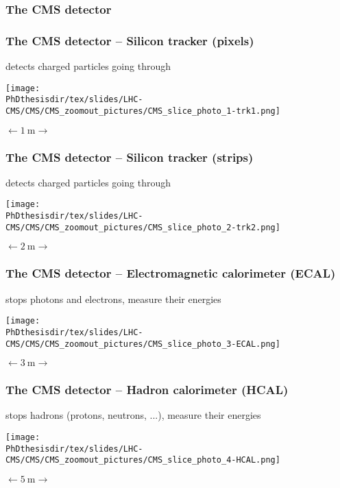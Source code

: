 \begin{frame}
\frametitle{The CMS detector}
\end{frame}
\begin{frame}\addtocounter{framenumber}{-1}
\frametitle{The CMS detector -- Silicon tracker (pixels)}
\begin{center}
detects charged particles going through

\vfill

\texttt{[image: \\PhDthesisdir/tex/slides/LHC-CMS/CMS/CMS\_zoomout\_pictures/CMS\_slice\_photo\_1-trk1.png]}

\vfill

$\longleftarrow \SI{1}{\meter} \longrightarrow$
\end{center}
\end{frame}
\begin{frame}\addtocounter{framenumber}{-1}
\frametitle{The CMS detector -- Silicon tracker (strips)}
\begin{center}
detects charged particles going through

\vfill

\texttt{[image: \\PhDthesisdir/tex/slides/LHC-CMS/CMS/CMS\_zoomout\_pictures/CMS\_slice\_photo\_2-trk2.png]}

\vfill

$\longleftarrow \SI{2}{\meter} \longrightarrow$
\end{center}
\end{frame}
\begin{frame}\addtocounter{framenumber}{-1}
\frametitle{The CMS detector -- Electromagnetic calorimeter (ECAL)}
\begin{center}
stops photons and electrons, measure their energies

\vfill

\texttt{[image: \\PhDthesisdir/tex/slides/LHC-CMS/CMS/CMS\_zoomout\_pictures/CMS\_slice\_photo\_3-ECAL.png]}

\vfill

$\longleftarrow \SI{3}{\meter} \longrightarrow$
\end{center}
\end{frame}
\begin{frame}\addtocounter{framenumber}{-1}
\frametitle{The CMS detector -- Hadron calorimeter (HCAL)}
\begin{center}
stops hadrons (protons, neutrons, ...), measure their energies

\vfill

\texttt{[image: \\PhDthesisdir/tex/slides/LHC-CMS/CMS/CMS\_zoomout\_pictures/CMS\_slice\_photo\_4-HCAL.png]}

\vfill

$\longleftarrow \SI{5}{\meter} \longrightarrow$
\end{center}
\end{frame}
